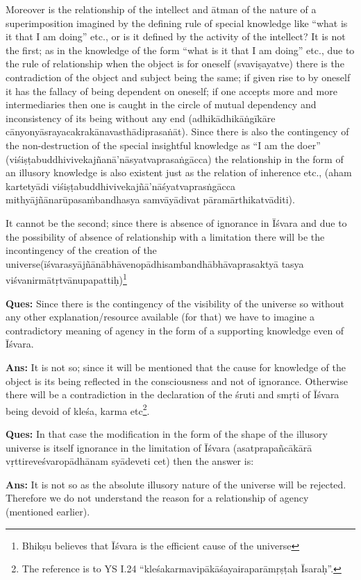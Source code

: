 Moreover is the relationship of the intellect and ātman of the nature of a superimposition imagined by the defining rule of special knowledge like “what is it that I am doing” etc., or is it defined by the activity of the intellect? It is not the first; as in the knowledge of the form “what is it that I am doing” etc., due to the rule of relationship when the object is for oneself (svaviṣayatve) there is the contradiction of the object and subject being the same; if given rise to by oneself it has the fallacy of being dependent on oneself; if one accepts more and more intermediaries then one is caught in the circle of mutual dependency and inconsistency of its being without any end (adhikādhikāṅgīkāre cānyonyāsrayacakrakānavasthādiprasaṅāt). Since there is also the contingency of the non-destruction of the special insightful knowledge as “I am the doer” (viśiṣṭabuddhivivekajñanā’nāsyatvaprasaṅgācca) the relationship in the form of an illusory knowledge is also existent just as the relation of inherence etc., (aham kartetyādi viśiṣṭabuddhivivekajñā’nāśyatvaprasṅgācca mithyājñānarūpasaṁbandhasya samvāyādivat pāramārthikatvāditi).

It cannot be the second; since there is absence of ignorance in Īśvara and due to the possibility of absence of relationship with a limitation there will be the incontingency of the creation of the universe\break (īśvarasyājñānābhāvenopādhisambandhābhāvaprasaktyā tasya viśva\-nirmātṛtvānupapattiḥ)\footnote{Bhikṣu believes that Īśvara is the efficient cause of the universe}

\textbf{Ques:} Since there is the contingency of the visibility of the universe so without any other explanation/resource available (for that) we have to imagine a contradictory meaning of agency in the form of a supporting knowledge even of Īśvara.

\textbf{Ans:} It is not so; since it will be mentioned that the cause for knowledge of the object is its being reflected in the consciousness and not of ignorance. Otherwise there will be a contradiction in the declaration of the śruti and smṛti of Īśvara being devoid of kleśa, karma etc\footnote{The reference is to YS I.24 “kleśakarmavipākāśayairaparāmṛṣṭah Īsaraḥ”.}.

\textbf{Ques:} In that case the modification in the form of the shape of the illusory universe is itself ignorance in the limitation of Īśvara (asatprapañcākārā vṛttireveśvaropādhānam syādeveti cet) then the answer is:

\textbf{Ans:} It is not so as the absolute illusory nature of the universe will be rejected. Therefore we do not understand the reason for a relationship of agency (mentioned earlier).

